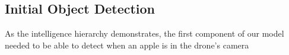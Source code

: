\subsection{Initial Object Detection}
As the intelligence hierarchy demonstrates, the first component of our model needed to be able to detect when an apple is in the drone's camera